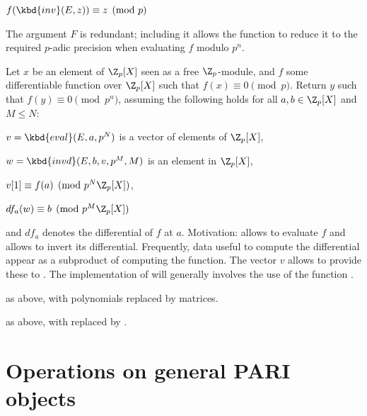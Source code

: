\item $f(\kbd{inv}(E, z)) \equiv z \pmod{p}$

The argument $F$ is redundant; including it allows the function
to reduce it to the required $p$-adic precision when evaluating $f$ modulo
$p^n$.


Let $x$ be an element of $\Z_p[X]$ seen as a free  $\Z_p$-module, and $f$
some differentiable function over $\Z_p[X]$ such that $f(x) \equiv 0
\pmod{p}$. Return $y$ such that $f(y) \equiv 0\pmod{p^n}$, assuming the
following holds for all $a, b\in \Z_p[X]$ and $M\leq N$:

\item $v = \kbd{eval}(E,a,p^N)$ is a vector of elements of $\Z_p[X]$,

\item $w = \kbd{invd}(E,b,v,p^M,M)$ is an element in $\Z_p[X]$,

\item $v[1] \equiv f(a) \pmod{p^N\Z_p[X]}$,

\item $df_a(w) \equiv b \pmod{p^M\Z_p[X]}$

\noindent and $df_a$ denotes the differential of $f$ at $a$. Motivation:
 allows to evaluate $f$ and  allows to invert its
differential. Frequently, data useful to compute the differential appear as a
subproduct of computing the function. The vector $v$ allows  to
provide these to . The implementation of  will generally
involves the use of the function .

as above, with polynomials replaced by matrices.

as above, with  replaced by .


\newpage
\chapter{Operations on general PARI objects}

